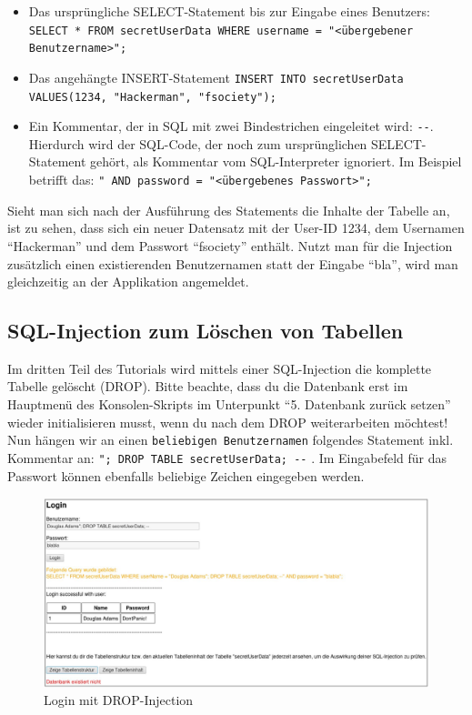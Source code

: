 \begin{itemize}
	\item Das ursprüngliche SELECT-Statement bis zur Eingabe eines Benutzers:  \colorbox{altgray}{\lstinline|SELECT * FROM secretUserData WHERE username = "<übergebener Benutzername>";|}
	\item Das angehängte INSERT-Statement \colorbox{altgray}{\lstinline|INSERT INTO secretUserData VALUES(1234, "Hackerman", "fsociety");|}
	\item Ein Kommentar, der in SQL mit zwei Bindestrichen eingeleitet wird: \colorbox{altgray}{\lstinline|--|}. Hierdurch wird der SQL-Code, der noch zum ursprünglichen SELECT-Statement gehört, als Kommentar vom SQL-Interpreter ignoriert. Im Beispiel betrifft das: \colorbox{altgray}{\lstinline|" AND password = "<übergebenes Passwort>";|}
\end{itemize}

Sieht man sich nach der Ausführung des Statements die Inhalte der Tabelle an, ist zu sehen, dass sich ein neuer Datensatz mit der User-ID 1234, dem Usernamen \enquote{Hackerman} und dem Passwort \enquote{fsociety} enthält. Nutzt man für die Injection zusätzlich einen existierenden Benutzernamen statt der Eingabe \enquote{bla}, wird man gleichzeitig an der Applikation angemeldet.

\subsection{SQL-Injection zum Löschen von Tabellen}
Im dritten Teil des Tutorials wird mittels einer SQL-Injection die komplette Tabelle gelöscht (DROP). Bitte beachte, dass du die Datenbank erst im Hauptmenü des Konsolen-Skripts im Unterpunkt \enquote{5. Datenbank zurück setzen} wieder initialisieren musst, wenn du nach dem DROP weiterarbeiten möchtest! Nun hängen wir an einen \colorbox{altgray}{\lstinline|beliebigen Benutzernamen|} folgendes Statement inkl. Kommentar an: \colorbox{altgray}{\lstinline|"; DROP TABLE secretUserData; --|} . Im Eingabefeld für das Passwort können ebenfalls beliebige Zeichen eingegeben werden.
 
\begin{figure}[H]
	\centering
	\includegraphics[width=\textwidth]{images/SQL_Injection/drop_injection.jpg}
	\caption{Login mit DROP-Injection}
	\label{fig:drop_injection}
\end{figure}

